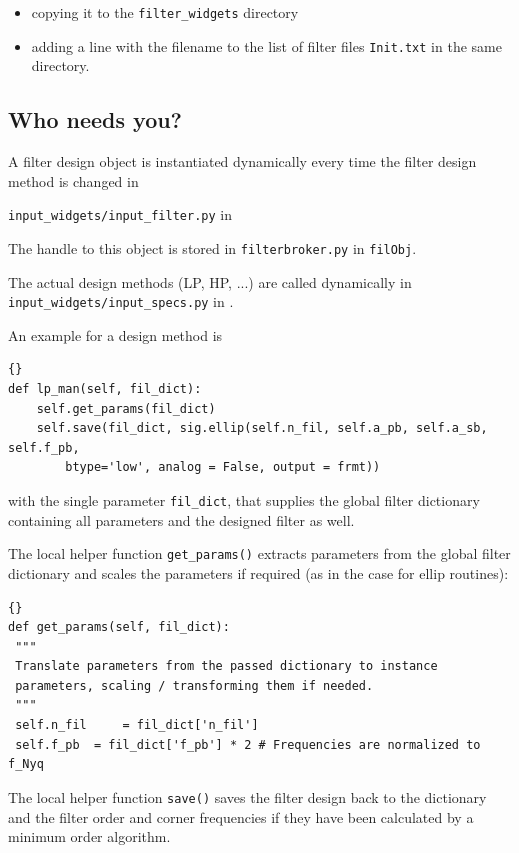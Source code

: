 \documentclass[paper=a4, pagesize, twoside, draft=false,
BCOR7mm, DIV13, fontsize=11pt, headings=normal, footinclude=false, 
toc=listof, english, parskip=half]{scrartcl} %
\begin{document}
\begin{itemize}
\item copying it to the \texttt{filter\_widgets} directory
\item adding a line with the filename to the list of filter files \texttt{Init.txt} in the same directory.
\end{itemize}




\subsection{Who needs you?}
A filter design object is instantiated dynamically every time the filter design method is changed in 

\texttt{input\_widgets/input\_filter.py} in 

The handle to this object is stored in \texttt{filterbroker.py} in \texttt{filObj}.

The actual design methods (LP, HP, ...) are called dynamically in \texttt{input\_widgets/input\_specs.py} in .

An example for a design method is
\begin{lstlisting}[style = pyStyle]{}
def lp_man(self, fil_dict):
	self.get_params(fil_dict)
	self.save(fil_dict, sig.ellip(self.n_fil, self.a_pb, self.a_sb, self.f_pb, 
		btype='low', analog = False, output = frmt))
\end{lstlisting}

with the single parameter \texttt{fil\_dict}, that supplies the global filter dictionary containing all parameters and the designed filter as well. 

The local helper function \texttt{get\_params()} extracts parameters from the global filter dictionary and scales the parameters if required (as in the case for ellip routines):

\begin{lstlisting}[style = pyStyle]{}
def get_params(self, fil_dict):
 """
 Translate parameters from the passed dictionary to instance
 parameters, scaling / transforming them if needed.
 """
 self.n_fil     = fil_dict['n_fil']
 self.f_pb  = fil_dict['f_pb'] * 2 # Frequencies are normalized to f_Nyq
\end{lstlisting}

The local helper function \texttt{save()} saves the filter design back to the dictionary and the filter order and corner frequencies if they have been calculated by a minimum order algorithm.
\end{document}
